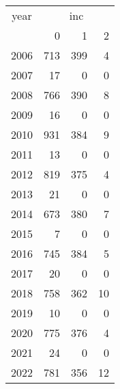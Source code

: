 \footnotesize\begin{tabular}[t]{lrrr}
\toprule
\multicolumn{1}{c}{year} & \multicolumn{3}{c}{inc} \\
\cmidrule(l{3pt}r{3pt}){1-1} \cmidrule(l{3pt}r{3pt}){2-4}
  & 0 & 1 & 2\\
\midrule
2006 & 713 & 399 & 4\\
2007 & 17 & 0 & 0\\
2008 & 766 & 390 & 8\\
2009 & 16 & 0 & 0\\
2010 & 931 & 384 & 9\\
2011 & 13 & 0 & 0\\
2012 & 819 & 375 & 4\\
2013 & 21 & 0 & 0\\
2014 & 673 & 380 & 7\\
2015 & 7 & 0 & 0\\
2016 & 745 & 384 & 5\\
2017 & 20 & 0 & 0\\
2018 & 758 & 362 & 10\\
2019 & 10 & 0 & 0\\
2020 & 775 & 376 & 4\\
2021 & 24 & 0 & 0\\
2022 & 781 & 356 & 12\\
\bottomrule
\end{tabular}
